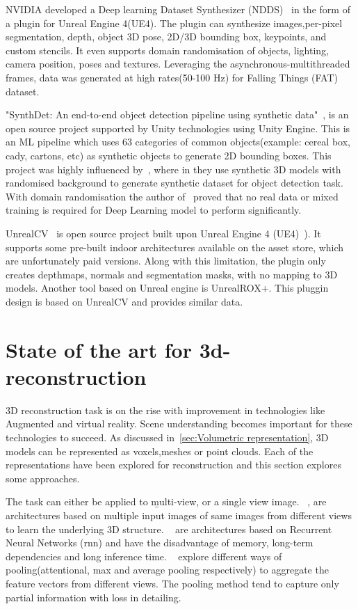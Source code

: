 NVIDIA developed a Deep learning Dataset Synthesizer (NDDS)~\cite{to2018ndds} in the form of a plugin for Unreal Engine 4(UE4).
The plugin can synthesize images,per-pixel segmentation, depth, object 3D pose, 2D/3D bounding box, keypoints, and custom stencils.
It even supports domain randomisation of objects, lighting, camera position, poses and textures.
Leveraging the asynchronous-multithreaded frames, data was generated at high rates(50-100 Hz) for Falling Things (FAT)~\cite{tremblay2018falling} dataset.

"SynthDet: An end-to-end object detection pipeline using synthetic data"~\cite{synthdet2020}, is an open source project supported by Unity technologies using Unity Engine.
This is an ML pipeline which uses 63 categories of common objects(example: cereal box, cady, cartons, etc) as synthetic objects to generate 2D bounding boxes.
This project was highly influenced by~\cite{hinterstoisser2019annotation}, where in they use synthetic 3D models with randomised background to generate synthetic dataset for object detection task.
With domain randomisation the author of~\cite{hinterstoisser2019annotation} proved that no real data or mixed training is required for Deep Learning model to perform significantly.

UnrealCV~\cite{qiu2017unrealcv} is open source project built upon Unreal Engine 4 (UE4)~\cite{unrealengine}).
It supports some pre-built indoor architectures available on the asset store, which are unfortunately paid versions.
Along with this limitation, the plugin only creates depthmaps, normals and segmentation masks, with no mapping to 3D models.
Another tool based on Unreal engine is UnrealROX+\cite{martinezgonzalez2021unrealrox}.
This pluggin design is based on UnrealCV and provides similar data.

\section{State of the art for 3d-reconstruction}\label{sec:state_of_the_art}

3D reconstruction task is on the rise with improvement in technologies like Augmented and virtual reality.
Scene understanding becomes important for these technologies to succeed.
As discussed in~\ref{sec:Volumetric representation}, 3D models can be represented as voxels,meshes or point clouds.
Each of the representations have been explored for reconstruction and this section explores some approaches.

The task can either be applied to \b{multi-view, or a single view image}.
~\cite{Kar2017LearningAM, choy20163d, Yang_2019, huang2018deepmvs, Paschalidou2018RayNetLV, Xie_2019, Xie_2020}, are architectures based on multiple input images of same images from different views to learn the underlying 3D structure.
~\cite{Kar2017LearningAM, choy20163d} are architectures based on Recurrent Neural Networks (\gls{rnn}) and have the disadvantage of memory, long-term dependencies and long inference time.
~\cite{Yang_2019, huang2018deepmvs, Paschalidou2018RayNetLV} explore different ways of pooling(attentional, max and average pooling respectively) to aggregate the feature vectors from different views.
The pooling method tend to capture only partial information with loss in detailing.

